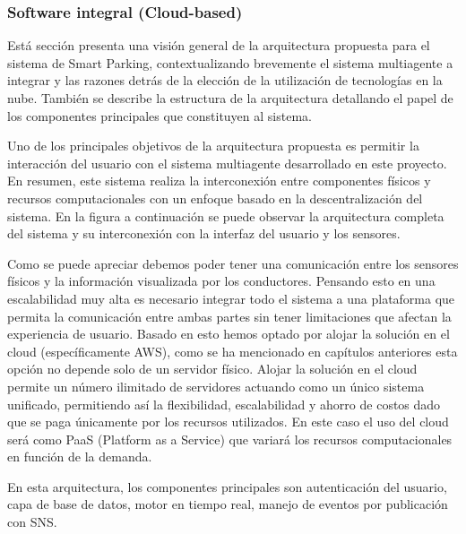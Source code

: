 \clearpage

\subsubsection{Software integral (Cloud-based)}
Está sección presenta una visión general de la arquitectura propuesta para el sistema de Smart Parking, contextualizando brevemente el sistema multiagente a integrar y las razones detrás de la elección de la utilización de tecnologías en la nube. También se describe la estructura de la arquitectura detallando el papel de los componentes principales que constituyen al sistema.


Uno de los principales objetivos de la arquitectura propuesta es permitir la interacción del usuario con el sistema multiagente desarrollado en este proyecto. En resumen, este sistema realiza la interconexión entre componentes físicos y recursos computacionales con un enfoque basado en la descentralización del sistema. En la figura a continuación se puede observar la arquitectura completa del sistema y su interconexión con la interfaz del usuario y los sensores.


Como se puede apreciar debemos poder tener una comunicación entre los sensores físicos y la información visualizada por los conductores. Pensando esto en una escalabilidad muy alta es necesario integrar todo el sistema a una plataforma que permita la comunicación entre ambas partes sin tener limitaciones que afectan la experiencia de usuario. Basado en esto hemos optado por alojar la solución en el cloud (específicamente AWS), como se ha mencionado en capítulos anteriores esta opción no depende solo de un servidor físico. Alojar la solución en el cloud permite un número ilimitado de servidores actuando como un único sistema unificado, permitiendo así la flexibilidad, escalabilidad y ahorro de costos dado que se paga únicamente por los recursos utilizados. En este caso el uso del cloud será como PaaS (Platform as a Service) que variará los recursos computacionales en función de la demanda.

En esta arquitectura, los componentes principales son autenticación del usuario, capa de base de datos, motor en tiempo real, manejo de eventos por publicación con SNS.

